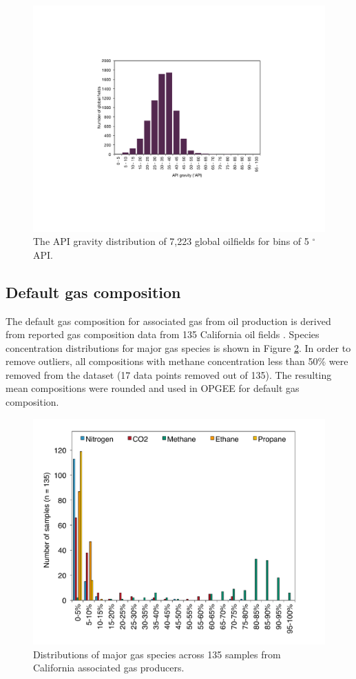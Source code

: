 \documentclass[11pt]{report}
\begin{document}
\begin{figure}
\includegraphics[width=0.8\columnwidth]{images/API.pdf}
\caption{The API gravity distribution of 7,223 global oilfields for bins of 5 $^\circ$API.}
\label{fig:API}
\end{figure}

\subsection{Default gas composition}

The default gas composition for associated gas from oil production is derived from reported gas composition data from 135 California oil fields \cite{Lee2011}. Species concentration distributions for major gas species is shown in Figure \ref{fig:gas_comp_major}. In order to remove outliers, all compositions with methane concentration less than 50\% were removed from the dataset (17 data points removed out of 135). The resulting mean compositions were rounded and used in OPGEE for default gas composition.

\begin{figure}
\includegraphics[width=0.8\columnwidth]{images/gas_comp_major.pdf}
\caption{Distributions of major gas species across 135 samples from California associated gas producers.}
\label{fig:gas_comp_major}
\end{figure}
\end{document}

